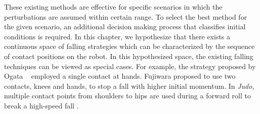 These existing methods are effective for specific scenarios in which
the perturbations are assumed within certain range. To select the best
method for the given scenario, an additional decision making process
that classifies initial conditions is required. In this chapter, we
hypothesize that there exists a continuous space of falling strategies
which can be characterized by the sequence of contact positions on the
robot. In this hypothesized space, the existing falling techniques can
be viewed as special cases. For example, the strategy proposed by
Ogata \etal~\cite{Ogata:2007:FMC} employed a single contact at
hands. Fujiwara \etal \cite{Fujiwara:2007:OPF} proposed to use two
contacts, knees and hands, to stop a fall with higher initial
momentum. In \emph{Judo}, multiple contact points from shoulders to
hips are used during a forward roll to break a high-speed fall \cite{ZenpoUkemi:2014:URL}. 


